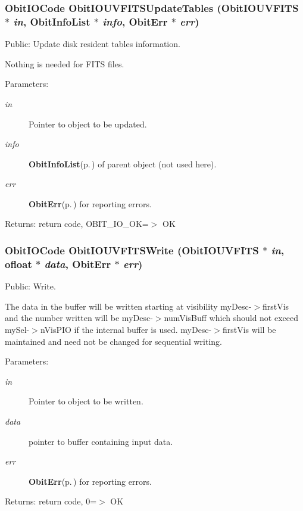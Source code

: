 \subsubsection{\setlength{\rightskip}{0pt plus 5cm}Obit\-IOCode Obit\-IOUVFITSUpdate\-Tables ({\bf Obit\-IOUVFITS} $\ast$ {\em in}, {\bf Obit\-Info\-List} $\ast$ {\em info}, {\bf Obit\-Err} $\ast$ {\em err})}\label{ObitIOUVFITS_8h_a25}


Public: Update disk resident tables information. 

Nothing is needed for FITS files. \begin{Desc}
\item[Parameters:]
\begin{description}
\item[{\em in}]Pointer to object to be updated. \item[{\em info}]{\bf Obit\-Info\-List}{\rm (p.\,\pageref{structObitInfoList})} of parent object (not used here). \item[{\em err}]{\bf Obit\-Err}{\rm (p.\,\pageref{structObitErr})} for reporting errors. \end{description}
\end{Desc}
\begin{Desc}
\item[Returns:]return code, OBIT\_\-IO\_\-OK=$>$ OK \end{Desc}
\subsubsection{\setlength{\rightskip}{0pt plus 5cm}Obit\-IOCode Obit\-IOUVFITSWrite ({\bf Obit\-IOUVFITS} $\ast$ {\em in}, {\bf ofloat} $\ast$ {\em data}, {\bf Obit\-Err} $\ast$ {\em err})}\label{ObitIOUVFITS_8h_a19}


Public: Write. 

The data in the buffer will be written starting at visibility my\-Desc-$>$first\-Vis and the number written will be my\-Desc-$>$num\-Vis\-Buff which should not exceed my\-Sel-$>$n\-Vis\-PIO if the internal buffer is used. my\-Desc-$>$first\-Vis will be maintained and need not be changed for sequential writing. \begin{Desc}
\item[Parameters:]
\begin{description}
\item[{\em in}]Pointer to object to be written. \item[{\em data}]pointer to buffer containing input data. \item[{\em err}]{\bf Obit\-Err}{\rm (p.\,\pageref{structObitErr})} for reporting errors. \end{description}
\end{Desc}
\begin{Desc}
\item[Returns:]return code, 0=$>$ OK \end{Desc}
